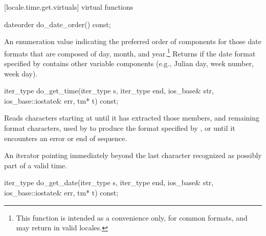 [locale.time.get.virtuals]{ virtual functions}

%
%
\begin{itemdecl}
dateorder do_date_order() const;
\end{itemdecl}

\begin{itemdescr}
\pnum
\returns
An enumeration value indicating the preferred order of components for
those date formats that are composed of day, month, and year.\footnote{This
function is intended as a convenience only, for common
formats, and may return
in valid locales.}
Returns
if the date format specified by
contains other variable components (e.g., Julian day, week number, week day).
\end{itemdescr}

%
%
\begin{itemdecl}
iter_type do_get_time(iter_type s, iter_type end, ios_base& str,
                      ios_base::iostate& err, tm* t) const;
\end{itemdecl}

\begin{itemdescr}
\pnum
\effects
Reads characters starting at 
until it has extracted those
members, and remaining format characters, used by
to produce the format specified by
,
or until it encounters an error or end of sequence.

\pnum
\returns
An iterator pointing immediately beyond the last character recognized
as possibly part of a valid time.
\end{itemdescr}

%
%
\begin{itemdecl}
iter_type do_get_date(iter_type s, iter_type end, ios_base& str,
                      ios_base::iostate& err, tm* t) const;
\end{itemdecl}

